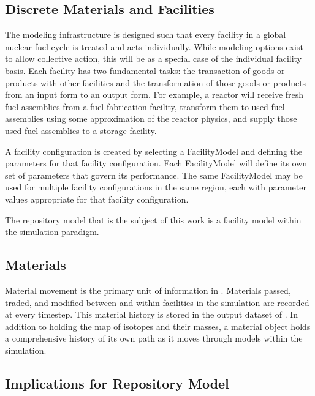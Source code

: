 \subsection{Discrete Materials and Facilities}

The \Cyclus modeling infrastructure is designed such that every
facility in a global nuclear fuel cycle is treated and acts
individually. While modeling options exist to allow collective
action, this will be as a special case of the individual facility
basis. Each facility has two fundamental tasks: the transaction of
goods or products with other facilities and the transformation of
those goods or products from an input form to an output form.  For
example, a reactor will receive fresh fuel assemblies from a fuel
fabrication facility, transform them to used fuel assemblies
using some approximation of the reactor physics, and supply those used
fuel assemblies to a storage facility.

A facility configuration is created by selecting a FacilityModel and 
defining the parameters for that facility configuration.
Each FacilityModel will define its own set of parameters that 
govern its performance.  The same FacilityModel may be used for 
multiple facility configurations in the same region, each with 
parameter values appropriate for that facility configuration.

The repository model that is the subject of this work is a facility 
model within the \Cyclus simulation paradigm. 

\subsection{Materials}

Material movement is the primary unit of information in \Cyclus.  
Materials passed, traded, and modified between and within facilities 
in the simulation are recorded at every timestep.  This material 
history is stored in the output dataset of \Cyclus. In addition to 
holding the map of isotopes and their masses, a material object holds 
a comprehensive history of its own path as it moves through models 
within the simulation. 

\subsection{Implications for Repository Model}

